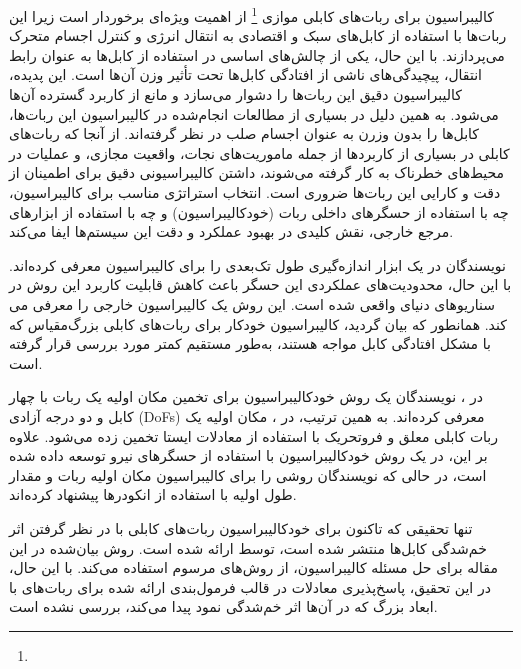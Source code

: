  کالیبراسیون برای ربات‌های کابلی موازی
  \footnote{}
  از اهمیت ویژه‌ای برخوردار است زیرا این ربات‌ها با استفاده از کابل‌های سبک و اقتصادی به انتقال انرژی و کنترل اجسام متحرک می‌پردازند. با این حال، یکی از چالش‌های اساسی در استفاده از کابل‌ها به عنوان رابط انتقال، پیچیدگی‌های ناشی از افتادگی کابل‌ها تحت تأثیر وزن آن‌ها است. این پدیده، کالیبراسیون دقیق این ربات‌ها را دشوار می‌سازد و مانع از کاربرد گسترده آن‌ها می‌شود. به همین دلیل در بسیاری از مطالعات انجام‌شده در کالیبراسیون این ربات‌ها، کابل‌ها را بدون وزرن به عنوان اجسام صلب در نظر گرفته‌اند. از آنجا که ربات‌های کابلی در بسیاری از کاربردها از جمله ماموریت‌های نجات، واقعیت مجازی، و عملیات در محیط‌های خطرناک به کار گرفته می‌شوند، داشتن کالیبراسیونی دقیق برای اطمینان از دقت و کارایی این ربات‌ها ضروری است. انتخاب استراتژی مناسب برای کالیبراسیون، چه با استفاده از حسگرهای داخلی ربات (خودکالیبراسیون) و چه با استفاده از ابزارهای مرجع خارجی، نقش کلیدی در بهبود عملکرد و دقت این سیستم‌ها ایفا می‌کند. 
 
نویسندگان در \cite{jin2018geometric} یک ابزار اندازه‌گیری طول تک‌بعدی را برای کالیبراسیون معرفی کرده‌اند. با این حال، محدودیت‌های عملکردی این حسگر باعث کاهش قابلیت کاربرد این روش در سناریوهای دنیای واقعی شده است. این روش یک کالیبراسیون خارجی را معرفی می کند. همانطور که بیان گردید، کالیبراسیون خودکار برای ربات‌های کابلی بزرگ‌مقیاس که با مشکل افتادگی کابل مواجه هستند، به‌طور مستقیم کمتر مورد بررسی قرار گرفته است. 

در \cite{borgstrom2009nims}، نویسندگان یک روش خودکالیبراسیون برای تخمین مکان اولیه یک ربات با چهار کابل و دو درجه آزادی (DoFs) معرفی کرده‌اند. به همین ترتیب، در \cite{ida2019automatic}، مکان اولیه یک ربات کابلی معلق و فروتحریک با استفاده از معادلات ایستا تخمین زده می‌شود. علاوه بر این، در \cite{pott2013cable_ForceSensorCalib} یک روش خودکالیبراسیون با استفاده از حسگرهای نیرو توسعه داده شده است، در حالی که نویسندگان \cite{darvin2018initial} روشی را برای کالیبراسیون مکان اولیه ربات و مقدار طول اولیه با استفاده از انکودرها پیشنهاد کرده‌اند. 
 
تنها تحقیقی که تاکنون برای خودکالیبراسیون ربات‌های کابلی با در نظر گرفتن اثر خم‌شدگی کابل‌ها منتشر شده است، توسط \cite{an2022all} ارائه شده است. روش بیان‌شده در این مقاله برای حل مسئله کالیبراسیون، از روش‌های مرسوم استفاده می‌کند. با این حال، در این تحقیق، پاسخ‌پذیری معادلات در قالب فرمول‌بندی ارائه شده برای ربات‌های با ابعاد بزرگ که در آن‌ها اثر خم‌شدگی نمود پیدا می‌کند، بررسی نشده است.







